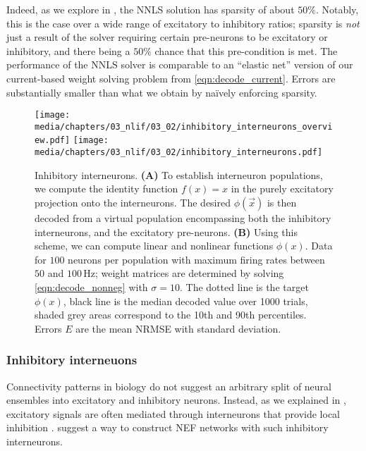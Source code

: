 Indeed, as we explore in , the NNLS solution has sparsity of about $50\%$.
Notably, this is the case over a wide range of excitatory to inhibitory ratios; sparsity is \emph{not} just a result of the solver requiring certain pre-neurons to be excitatory or inhibitory, and there being a $50\%$ chance that this pre-condition is met.
The performance of the NNLS solver is comparable to an \enquote{elastic net} version of our current-based weight solving problem from \cref{eqn:decode_current}.
Errors are substantially smaller than what we obtain by na\"ively enforcing sparsity.

\begin{figure}
	\texttt{[image: media/chapters/03\_nlif/03\_02/inhibitory\_interneurons\_overview.pdf]}\hspace{0.4204cm}%
	\texttt{[image: media/chapters/03\_nlif/03\_02/inhibitory\_interneurons.pdf]}%
	{\label{fig:inhibitory_interneurons_a}}%
	{\label{fig:inhibitory_interneurons_b}}%
	\caption[Inhibitory interneurons]{Inhibitory interneurons.
	\textbf{(A)} To establish interneuron populations, we compute the identity function $f(x) = x$ in the purely excitatory projection onto the interneurons.
	The desired $\phi(\vec x)$ is then decoded from a virtual population encompassing both the inhibitory interneurons, and the excitatory pre-neurons.
	\textbf{(B)} Using this scheme, we can compute linear and nonlinear functions $\phi(x)$.
	Data for $100$ neurons per population with maximum firing rates between $50$ and $100\,\mathrm{Hz}$; weight matrices are determined by solving \cref{eqn:decode_nonneg} with $\sigma = 10$.
	The dotted line is the target $\phi(x)$, black line is the median decoded value over 1000 trials, shaded grey areas correspond to the 10th and 90th percentiles.
	Errors $E$ are the mean NRMSE with standard deviation.
	}
	\label{fig:inhibitory_interneurons}
\end{figure}

\subsubsection{Inhibitory interneuons}
Connectivity patterns in biology do not suggest an arbitrary split of neural ensembles into excitatory and inhibitory neurons.
Instead, as we explained in , excitatory signals are often mediated through interneurons that provide local inhibition \citep[e.g.,][Chapter~2]{kandel2012principles}.
\citet{parisien2008solving} suggest a way to 
construct NEF networks with such inhibitory interneurons.

